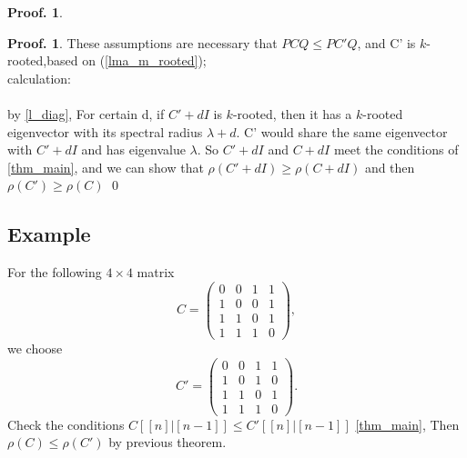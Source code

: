 \documentclass{article}
\theoremstyle{plain}
\theoremstyle{definition}
\newtheorem{pof}[thm]{Proof.}
\begin{document}
\begin{pof}
\begin{pof}
    These assumptions are necessary that $PCQ \leq PC'Q$, and C' is $k$-rooted,based on
    (\ref{lma_m_rooted});\\
    calculation:  \\
       \\
    by \ref{l_diag}, For certain d, if $C'+dI$ is $k$-rooted, then it has
     a $k$-rooted eigenvector with its spectral radius $\lambda + d$. C' would share the same
      eigenvector with $C'+dI$ and has eigenvalue $\lambda$. So $C'+dI$ and $C+dI$ meet the
       conditions of \ref{thm_main}, and we can show that $\rho(C' + dI) \geq \rho(C +dI)$ and
        then $\rho(C') \geq \rho(C)$  \qed
\end{pof}



\subsection{Example}
    For the following $4\times 4$ matrix
    $$C=\begin{pmatrix}
    0 & 0 & 1 & 1\\
    1 & 0 & 0 & 1\\
    1 & 1 & 0 & 1\\
    1 & 1 & 1 & 0
    \end{pmatrix},$$
    we choose
    $$C'=\begin{pmatrix}
    0 & 0 & 1 & 1\\
    1 & 0 & 1 &  0\\
    1 & 1 & 0 & 1\\
    1 & 1 & 1 & 0
    \end{pmatrix}.$$
    Check the conditions $C[[n]|[n-1]]  \leq C'[[n]|[n-1]] $ \ref{thm_main},
    Then
    $\rho(C)\leq \rho(C')$ by previous theorem.




\end{pof}
\end{document}
